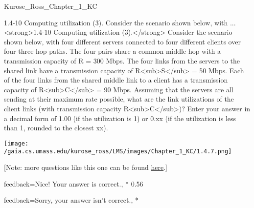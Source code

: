 \documentclass[a4paper,twocolumn]{article}
\begin{document}
\begin{quiz}{Kurose_Ross_Chapter_1_KC}
\begin{shortanswer}[
	points=1,
	penalty=0.33333,
]{1.4-10 Computing utilization (3). Consider the scenario shown below, with ...}
<strong>1.4-10 Computing utilization (3).</strong> Consider the scenario shown below, with four different servers connected to four different clients over four three-hop paths. The four pairs share a common middle hop with a transmission capacity of R = 300 Mbps. The four links from the servers to the shared link have a transmission capacity of R<sub>S</sub> = 50 Mbps. Each of the four links from the shared middle link to a client has a transmission capacity of R<sub>C</sub> = 90 Mbps. Assuming that the servers are all sending at their maximum rate possible, what are the link utilizations of the client links (with transmission capacity R<sub>C</sub>)? Enter your answer in a decimal form of 1.00 (if the utilization is 1) or 0.xx (if the utilization is less than 1, rounded to the closest xx). 
\begin{center}
\texttt{[image: /gaia.cs.umass.edu/kurose\_ross/LMS/images/Chapter\_1\_KC/1.4.7.png]}
\end{center}
 [Note: more questions like this one can be found \href{http://gaia.cs.umass.edu/kurose_ross/interactive/end-end-throughput-simple.php}{here}.]
\item[feedback={Nice!  Your answer is correct.},]* 0.56
\item[feedback={Sorry, your answer isn't correct.},] *
\end{shortanswer}

\end{quiz}
\end{document}
